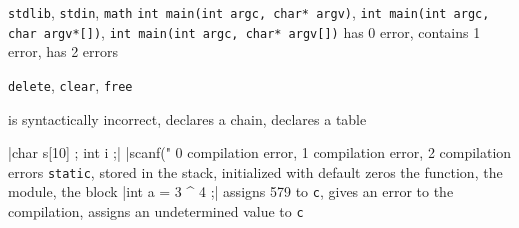 \documentclass[10pt]{article}
\begin{document}
\begin{center}
\begin{alterqcm}[lq=90mm,title,num=true,alea,long]
{{\texttt{stdlib}},
 {\texttt{stdin}},
 {\texttt{math}}}
{{\texttt{int main(int argc, char* argv)}},
 {\texttt{int main(int argc, char argv*[])}},
 {\texttt{int main(int argc, char* argv[])}}}
{{has 0 error},
 {contains 1 error},
 {has 2 errors}}

{{\texttt{delete}},
 {\texttt{clear}},
 {\texttt{free}}}

{{is syntactically incorrect},
 {declares a chain},
 {declares a table}}

\verbdef\arga|char s[10] ; int i ;|
\verbdef\argb|scanf("%
{{0 compilation error},
 {1 compilation error},
 {2 compilation errors}}
{{\texttt{static}},
 {stored in the stack},
 {initialized with default zeros}}
{{the function},
 {the module},
 {the block}}
\verbdef\argprop|int a = 3 ^ 4 ;| 
{{assigns 579 to \texttt{c}},
 {gives an error to the compilation},
 {assigns an undetermined value to \texttt{c}}}
 \end{alterqcm}
\end{center}
\end{document}
